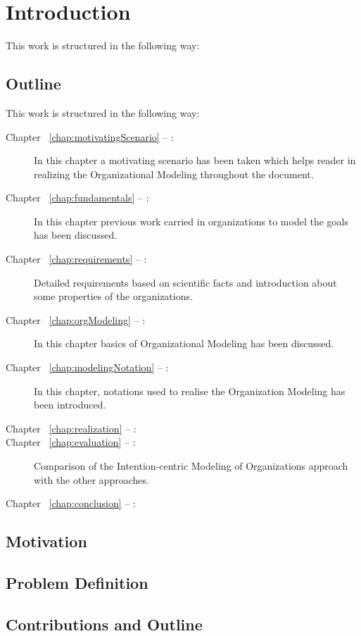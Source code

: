 \chapter{Introduction}
\label{chap:introduction}
This work is structured in the following way:

\section*{Outline}
This work is structured in the following way:
\begin{description}
\item[Chapter ~\ref{chap:motivatingScenario} -- :] In this chapter a motivating scenario has been taken which helps reader in realizing the Organizational Modeling throughout the document. 
\item[Chapter ~\ref{chap:fundamentals} -- :] In this chapter previous work carried in organizations to model the goals has been discussed.
\item[Chapter ~\ref{chap:requirements} -- :] Detailed requirements based on scientific facts and introduction about some properties of the organizations.
\item[Chapter ~\ref{chap:orgModeling} -- :] In this chapter basics of Organizational Modeling has been discussed.
\item[Chapter ~\ref{chap:modelingNotation} -- :] In this chapter, notations used to realise the Organization Modeling has been introduced. 
\item[Chapter ~\ref{chap:realization} -- :] 
\item[Chapter ~\ref{chap:evaluation} -- :] Comparison of the Intention-centric Modeling of Organizations approach with the other approaches.
\item[Chapter ~\ref{chap:conclusion} -- :] 
\end{description}


\section{Motivation}


\section{Problem Definition}

\section{Contributions and Outline}
